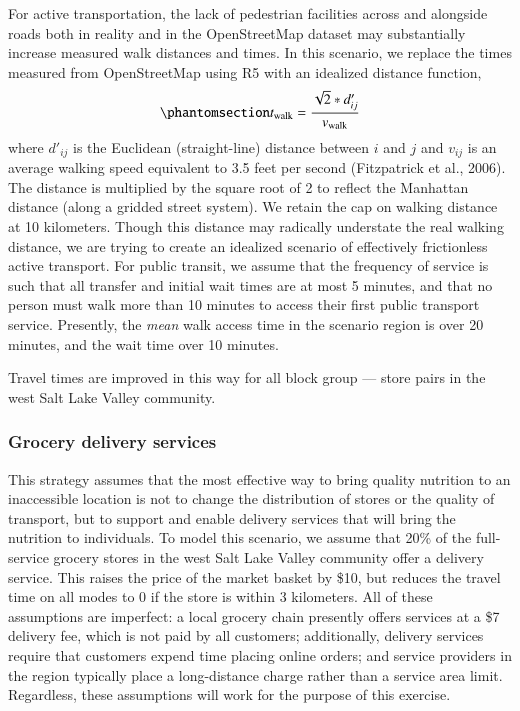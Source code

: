 \documentclass[
  letterpaper,
  number,
  review,
  3p]{elsarticle}
\begin{document}
For active transportation, the lack of pedestrian facilities across and
alongside roads both in reality and in the OpenStreetMap dataset may
substantially increase measured walk distances and times. In this
scenario, we replace the times measured from OpenStreetMap using R5 with
an idealized distance function,
\begin{equation}\phantomsection\label{eq-newwalk}{
t_{\mathrm{walk}} = \frac{\sqrt{2} * d'_{ij}}{v_{\mathrm{walk}}}
}\end{equation} where \(d'_{ij}\) is the Euclidean (straight-line)
distance between \(i\) and \(j\) and \(v_{ij}\) is an average walking
speed equivalent to 3.5 feet per second (Fitzpatrick et al., 2006). The
distance is multiplied by the square root of 2 to reflect the Manhattan
distance (along a gridded street system). We retain the cap on walking
distance at 10 kilometers. Though this distance may radically understate
the real walking distance, we are trying to create an idealized scenario
of effectively frictionless active transport. For public transit, we
assume that the frequency of service is such that all transfer and
initial wait times are at most 5 minutes, and that no person must walk
more than 10 minutes to access their first public transport service.
Presently, the \emph{mean} walk access time in the scenario region is
over 20 minutes, and the wait time over 10 minutes.

Travel times are improved in this way for all block group --- store
pairs in the west Salt Lake Valley community.

\subsubsection{Grocery delivery
services}\label{grocery-delivery-services}

This strategy assumes that the most effective way to bring quality
nutrition to an inaccessible location is not to change the distribution
of stores or the quality of transport, but to support and enable
delivery services that will bring the nutrition to individuals. To model
this scenario, we assume that 20\% of the full-service grocery stores in
the west Salt Lake Valley community offer a delivery service. This
raises the price of the market basket by \$10, but reduces the travel
time on all modes to 0 if the store is within 3 kilometers. All of these
assumptions are imperfect: a local grocery chain presently offers
services at a \$7 delivery fee, which is not paid by all customers;
additionally, delivery services require that customers expend time
placing online orders; and service providers in the region typically
place a long-distance charge rather than a service area limit.
Regardless, these assumptions will work for the purpose of this
exercise.
\end{document}
